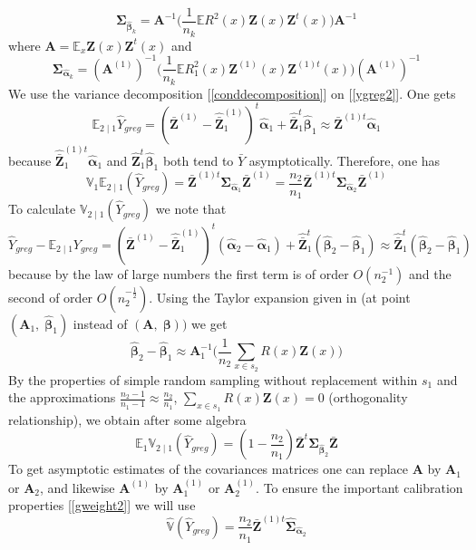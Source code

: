 \documentclass[a4paper,12pt,leqno, titlepage]{article}
\newcommand{\EX}{\mathbb{E}}
\newcommand{\VAR}{\mathbb{V}}
\begin{document}
{\begin{equation}
\pmb{\Sigma}_{\hat{\pmb{\beta}}_k}=\pmb{A}^{-1}
\Big(\frac{1}{n_k}\EX R^2(x)\pmb{Z}(x)\pmb{Z}^t(x)\Big)\pmb{A}^{-1}
\end{equation}
where $\pmb{A}=\EX_x \pmb{Z}(x)\pmb{Z}^t(x)$ and
\begin{equation}\label{lemma2}
\pmb{\Sigma}_{\hat{\pmb{\alpha}}_k}=(\pmb{A}^{(1)})^{-1}
\Big(\frac{1}{n_k}\EX R_1^2(x)\pmb{Z}^{(1)}(x)\pmb{Z}^{(1)t}(x)\Big)(\pmb{A}^{(1)})^{-1}
\end{equation}
We use the variance decomposition [\ref{conddecomposition}] on [\ref{ygreg2}]. One gets
$$\EX_{2 \mid 1}\hat{Y}_{greg}=(\bar{\pmb{Z}}^{(1)}-\hat{\bar{\pmb{Z}}}_1^{(1)})^t\hat{\pmb{\alpha}}_1+
\hat{\bar{\pmb{Z}}}_1^t\hat{\pmb{\beta}}_1 \approx \bar{\pmb{Z}}^{(1)t}\hat{\pmb{\alpha}}_1$$
because $\hat{\bar{\pmb{Z}}}_1^{(1)t}\hat{\pmb{\alpha}}_1$ and $\hat{\pmb{Z}}^t_1\hat{\pmb{\beta}}_1$ both tend to $\bar{Y}$ asymptotically. Therefore, one has
$$\VAR_1\EX_{2 \mid 1}(\hat{Y}_{greg})=\bar{\pmb{Z}}^{(1)t}\pmb{\Sigma}_{\hat{\pmb{\alpha}}_1}\bar{\pmb{Z}}^{(1)}
=\frac{n_2}{n_1}\bar{\pmb{Z}}^{(1)t}\pmb{\Sigma}_{\hat{\pmb{\alpha}}_2}\bar{\pmb{Z}}^{(1)}$$
To calculate $\VAR_{2 \mid 1}(\hat{Y}_{greg})$ we note that
$$\hat{Y}_{greg}-\EX_{2 \mid 1}Y_{greg}=(\bar{\pmb{Z}}^{(1)}-\hat{\bar{\pmb{Z}}}_1^{(1)})^t(\hat{\pmb{\alpha}}_2-\hat{\pmb{\alpha}}_1)
+\hat{\bar{\pmb{Z}}}_1^t(\hat{\pmb{\beta}}_2-\hat{\pmb{\beta}}_1) \approx \hat{\bar{\pmb{Z}}}_1^t(\hat{\pmb{\beta}}_2-\hat{\pmb{\beta}}_1) $$
because by the law of large numbers the first term is of order $O(n_2^{-1})$ and the second of order $O(n_2^{-\frac{1}{2}})$. Using the Taylor expansion given in \cite{mandallaz} (at point $(\pmb{A}_1,\;\hat{\pmb{\beta}}_1)$ instead of $(\pmb{A},\;\pmb{\beta}))$ we get
$$\hat{\pmb{\beta}}_2-\hat{\pmb{\beta}}_1\approx \pmb{A}_1^{-1}\big(\frac{1}{n_2}\sum_{x\in{s_2}}R(x)\pmb{Z}(x)\big)$$
\noindent By the properties of simple random sampling without replacement within $s_1$ and the approximations $\frac{n_2-1}{n_1-1} \approx\frac{n_2}{n_1}$, $\sum_{x\in{s_1}}R(x)\pmb{Z}(x)=0$ (orthogonality relationship), we obtain after some algebra
$$\EX_1\VAR_{2 \mid 1}(\hat{Y}_{greg})=(1-\frac{n_2}{n_1})\bar{\pmb{Z}}^t\pmb{\Sigma}_{\hat{\pmb{\beta}}_2}\bar{\pmb{Z}}$$
\noindent To get asymptotic estimates of the covariances matrices one can replace $\pmb{A}$ by $\pmb{A}_1$ or $\pmb{A}_2$, and likewise $\pmb{A}^{(1)}$ by $\pmb{A}^{(1)}_1$ or $\pmb{A}^{(1)}_2$. To ensure the important calibration properties [\ref{gweight2}] we will use
\begin{equation}\label{estvarygregnew}
\hat{\VAR}(\hat{Y}_{greg})=\frac{n_2}{n_1}\bar{\pmb{Z}}^{(1)t}\hat{\pmb{\Sigma}}_{\hat{\pmb{\alpha}}_2}

\end{equation}}
\end{document}
